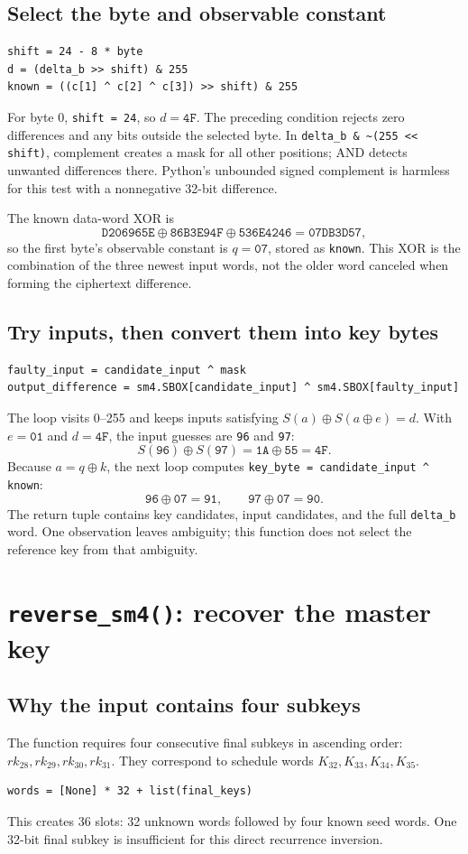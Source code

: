 \documentclass[11pt,a4paper]{article}
\newcommand{\hx}[1]{\texttt{#1}}
\newcommand{\hex}[1]{\texttt{#1}}
\newcommand{\xor}{\mathbin{\oplus}}
\begin{document}
\subsection{Select the byte and observable constant}
\begin{Verbatim}
shift = 24 - 8 * byte
d = (delta_b >> shift) & 255
known = ((c[1] ^ c[2] ^ c[3]) >> shift) & 255
\end{Verbatim}
For byte 0, \hx{shift = 24}, so $d=\hex{4F}$. The preceding condition rejects
zero differences and any bits outside the selected byte. In
\hx{delta\_b \& \~{}(255 << shift)}, complement creates a mask for all other
positions; AND detects unwanted differences there. Python's unbounded signed
complement is harmless for this test with a nonnegative 32-bit difference.

The known data-word XOR is
\[
\texttt{D206965E}\xor\texttt{86B3E94F}\xor\texttt{536E4246}
=\texttt{07DB3D57},
\]
so the first byte's observable constant is $q=\hex{07}$, stored as \hx{known}.
This XOR is the combination of the three newest input words, not the older
word canceled when forming the ciphertext difference.

\subsection{Try inputs, then convert them into key bytes}
\begin{Verbatim}
faulty_input = candidate_input ^ mask
output_difference = sm4.SBOX[candidate_input] ^ sm4.SBOX[faulty_input]
\end{Verbatim}
The loop visits 0--255 and keeps inputs satisfying
$S(a)\xor S(a\xor e)=d$. With $e=\hex{01}$ and $d=\hex{4F}$, the input guesses
are \hx{96} and \hx{97}:
\[
S(\hex{96})\xor S(\hex{97})=\hex{1A}\xor\hex{55}=\hex{4F}.
\]
Because $a=q\xor k$, the next loop computes \hx{key\_byte = candidate\_input \^{} known}:
\[
\hex{96}\xor\hex{07}=\hex{91},\qquad
\hex{97}\xor\hex{07}=\hex{90}.
\]
The return tuple contains key candidates, input candidates, and the full
\hx{delta\_b} word. One observation leaves ambiguity; this function does not
select the reference key from that ambiguity.

\section{\texorpdfstring{\texttt{reverse\_sm4()}}{reverse_sm4}: recover the master key}
\subsection{Why the input contains four subkeys}
The function requires four consecutive final subkeys in ascending order:
$rk_{28},rk_{29},rk_{30},rk_{31}$. They correspond to schedule words
$K_{32},K_{33},K_{34},K_{35}$.
\begin{Verbatim}
words = [None] * 32 + list(final_keys)
\end{Verbatim}
This creates 36 slots: 32 unknown words followed by four known seed words.
One 32-bit final subkey is insufficient for this direct recurrence inversion.
\end{document}
